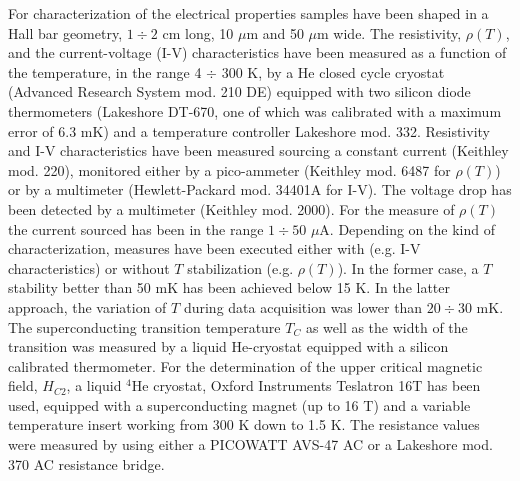 \documentclass[reprint,onecolumn,superscriptaddress,a4paper,nofootinbib,floatfix]{revtex4-1}
\begin{document}
For characterization of the electrical properties samples have been shaped in a Hall bar geometry, $1 \div 2$ cm long, 10 $\mu$m and 50 $\mu$m wide.
The resistivity, $\rho(T)$, and the current-voltage (I-V) characteristics have been measured as a function of the temperature, in the range 4 $\div$ 300 K, by a He closed cycle cryostat (Advanced Research System mod. 210 DE) equipped with two silicon diode thermometers (Lakeshore DT-670, one of which was calibrated with a maximum error of 6.3 mK) and a temperature controller Lakeshore mod. 332. Resistivity and I-V characteristics have been measured sourcing a constant current (Keithley mod. 220), monitored either by a pico-ammeter (Keithley mod. 6487 for $\rho(T)$) or by a multimeter (Hewlett-Packard mod. 34401A for I-V). The voltage drop has been detected by a multimeter (Keithley mod. 2000). For the measure of $\rho(T)$ the current sourced has been in the range $1 \div 50$ $\mu$A.
Depending on the kind of characterization, measures have been executed either with (e.g. I-V characteristics) or without $T$ stabilization (e.g. $\rho(T)$). In the former case, a $T$ stability better than 50 mK has been achieved below 15 K. In the latter approach, the variation of $T$ during data acquisition was lower than $20\div30$ mK. 
The superconducting transition temperature $T_C$ as well as the width of the transition was measured by a liquid He-cryostat equipped with a silicon calibrated thermometer. 
For the determination of the upper critical magnetic field, $H_{C2}$, a liquid $^4$He cryostat, Oxford Instruments Teslatron 16T has been used, equipped with a superconducting magnet (up to 16 T) and a variable temperature insert working from 300 K down to 1.5 K. The resistance values were measured by using either a PICOWATT AVS-47 AC or a Lakeshore mod. 370 AC resistance bridge. 
\end{document}
